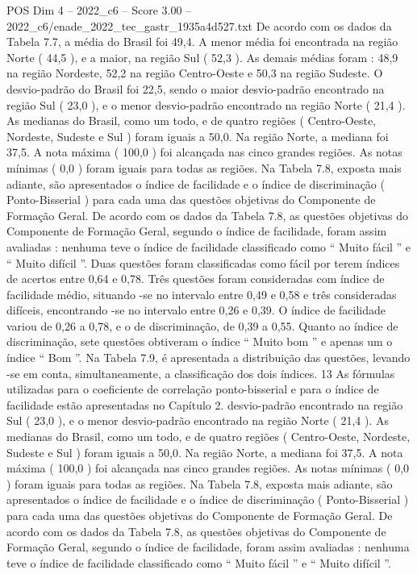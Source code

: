 \begin{textsample}{POS Dim 4 – 2022\_c6 – Score 3.00 – 2022\_c6/enade\_2022\_tec\_gastr\_1935a4d527.txt}
De acordo com os dados da Tabela 7.7, a média do Brasil foi 49,4.
A menor média foi encontrada na região Norte ( 44,5 ), e a maior, na região Sul ( 52,3 ).
As demais médias foram : 48,9 na região Nordeste, 52,2 na região Centro-Oeste e 50,3 na região Sudeste.
O desvio-padrão do Brasil foi 22,5, sendo o maior desvio-padrão encontrado na região Sul ( 23,0 ), e o menor desvio-padrão encontrado na região Norte ( 21,4 ).
As medianas do Brasil, como um todo, e de quatro regiões ( Centro-Oeste, Nordeste, Sudeste e Sul ) foram iguais a 50,0.
Na região Norte, a mediana foi 37,5.
A nota máxima ( 100,0 ) foi alcançada nas cinco grandes regiões.
As notas mínimas ( 0,0 ) foram iguais para todas as regiões.
Na Tabela 7.8, exposta mais adiante, são apresentados o índice de facilidade e o índice de discriminação ( Ponto-Bisserial ) para cada uma das questões objetivas do Componente de Formação Geral.
De acordo com os dados da Tabela 7.8, as questões objetivas do Componente de Formação Geral, segundo o índice de facilidade, foram assim avaliadas : nenhuma teve o índice de facilidade classificado como “ Muito fácil ” e “ Muito difícil ”.
Duas questões foram classificadas como fácil por terem índices de acertos entre 0,64 e 0,78.
Três questões foram consideradas com índice de facilidade médio, situando -se no intervalo entre 0,49 e 0,58 e três consideradas difíceis, encontrando -se no intervalo entre 0,26 e 0,39.
O índice de facilidade variou de 0,26 a 0,78, e o de discriminação, de 0,39 a 0,55.
Quanto ao índice de discriminação, sete questões obtiveram o índice “ Muito bom ” e apenas um o índice “ Bom ”.
Na Tabela 7.9, é apresentada a distribuição das questões, levando -se em conta, simultaneamente, a classificação dos dois índices. 13 As fórmulas utilizadas para o coeficiente de correlação ponto-bisserial e para o índice de facilidade estão apresentadas no Capítulo 2. desvio-padrão encontrado na região Sul ( 23,0 ), e o menor desvio-padrão encontrado na região Norte ( 21,4 ).
As medianas do Brasil, como um todo, e de quatro regiões ( Centro-Oeste, Nordeste, Sudeste e Sul ) foram iguais a 50,0.
Na região Norte, a mediana foi 37,5.
A nota máxima ( 100,0 ) foi alcançada nas cinco grandes regiões.
As notas mínimas ( 0,0 ) foram iguais para todas as regiões.
Na Tabela 7.8, exposta mais adiante, são apresentados o índice de facilidade e o índice de discriminação ( Ponto-Bisserial ) para cada uma das questões objetivas do Componente de Formação Geral.
De acordo com os dados da Tabela 7.8, as questões objetivas do Componente de Formação Geral, segundo o índice de facilidade, foram assim avaliadas : nenhuma teve o índice de facilidade classificado como “ Muito fácil ” e “ Muito difícil ”.

\end{textsample}
